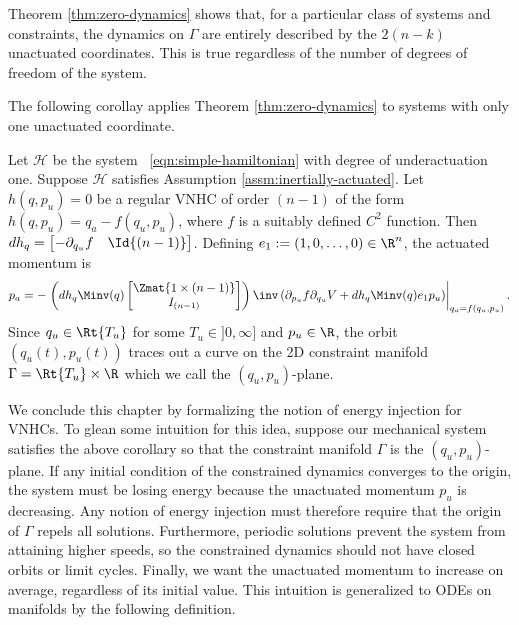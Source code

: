 Theorem \ref{thm:zero-dynamics} shows that, for a particular class of systems
and constraints, the dynamics on \(\Gamma\) are entirely described by the \(2(n-k)\)
unactuated coordinates.
This is true regardless of the number of degrees of freedom of the system.

The following corollay applies Theorem \ref{thm:zero-dynamics} to
systems with only one unactuated coordinate.

\begin{cor}\label{cor:2d-zero-dynamics}
    Let \(\mathcal{H}\) be the system ~\eqref{eqn:simple-hamiltonian} with degree
    of underactuation one.
    Suppose \(\mathcal{H}\) satisfies Assumption \ref{assm:inertially-actuated}.
    Let \(h(q,p_u) = 0\) be a regular VNHC of order \((n-1)\) of the form
    \(h(q,p_u) = q_a - f(q_u,p_u)\),
    where \(f\) is a suitably defined \(C^2\) function.
    Then \(dh_q = \begin{bmatrix} -\partial_{q_u}f & \Id{(n-1)}
    \end{bmatrix}\).
    Defining \(e_1 := (1,0,\ldots,0) \in \R^n\), the actuated momentum is
    \begin{equation}\label{eqn:g-qupu}
        p_a = -\left.\left(dh_q \Minv(q)
        \begin{bmatrix}
            \Zmat{1\times (n-1)}\\
            I_{(n-1)}
        \end{bmatrix}\right)\inv 
        \left(\partial_{p_u}f \partial_{q_u}V + dh_q \Minv(q)e_1 p_u\right) 
            \right|_{q_a =f(q_u,p_u)}
        .
    \end{equation}
    Since \(q_u \in \Rt{T_u}\) for some \(T_u \in ]0,\infty]\) and \(p_u \in \R\),
    the orbit \((q_u(t),p_u(t))\) traces out
    a curve on the 2D constraint manifold 
    \(\Gamma = \Rt{T_u} \times \R\) which we call the \((q_u,p_u)\)-plane.
\end{cor}

We conclude this chapter by formalizing the notion of energy injection for
VNHCs.
To glean some intuition for this idea, suppose our mechanical system satisfies
the above corollary so that the constraint manifold \(\Gamma\) is the
\((q_u,p_u)\)-plane.
If any initial condition of the constrained dynamics converges to the origin, 
the system must be losing energy because the unactuated momentum
\(p_u\) is decreasing.
Any notion of energy injection must therefore require that the origin of 
\(\Gamma\) repels all solutions.
Furthermore, periodic solutions prevent the system from attaining higher speeds,
so the constrained dynamics should not have closed orbits or limit cycles.
Finally, we want the unactuated momentum to increase on average, regardless of
its initial value. 
This intuition is generalized to ODEs on manifolds by the following definition.

